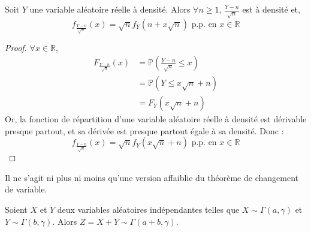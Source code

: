 





	\begin{lemma}
		\label{formule-de-stirling-1}
		Soit $Y$ une variable aléatoire réelle à densité. Alors $\forall n \geq 1$, $\frac{Y - n}{\sqrt{n}}$ est à densité et,
		\[ f_{\frac{Y - n}{\sqrt{n}}}(x) = \sqrt{n} f_{Y}(n + x \sqrt{n}) \text{ p.p. en } x \in \mathbb{R} \]
	\end{lemma}

	\begin{proof}
		$\forall x \in \mathbb{R}$,
		\begin{align*}
			F_{\frac{Y - n}{\sqrt{n}}}(x) & = \mathbb{P} \left(\frac{Y - n}{\sqrt{n}} \leq x \right) \\
			&= \mathbb{P} (Y \leq x \sqrt{n} + n) \\
			&= F_Y (x \sqrt{n} + n)
		\end{align*}
		Or, la fonction de répartition d'une variable aléatoire réelle à densité est dérivable presque partout, et sa dérivée est presque partout égale à sa densité. Donc :
		\[ f_{\frac{Y - n}{\sqrt{n}}}(x) = \sqrt{n} f_Y (x \sqrt{n} + n) \text{ p.p. en } x \in \mathbb{R} \]
	\end{proof}

	\begin{remark}
		Il ne s'agit ni plus ni moins qu'une version affaiblie du théorème de changement de variable.
	\end{remark}


	\begin{lemma}
		\label{formule-de-stirling-2}
		Soient $X$ et $Y$ deux variables aléatoires indépendantes telles que $X \sim \Gamma(a, \gamma)$ et $Y \sim \Gamma(b, \gamma)$. Alors $Z = X + Y \sim \Gamma(a+b, \gamma)$.
	\end{lemma}

